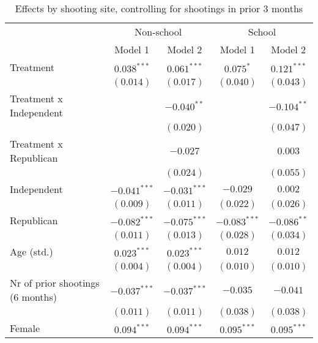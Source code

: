 
\begin{table}
\caption{Effects by shooting site, controlling for shootings in prior 3 months}
\begin{center}
\begin{tabular}{l c c c c}
\toprule
 & \multicolumn{2}{c}{Non-school} & \multicolumn{2}{c}{School} \\
\cmidrule(lr){2-3} \cmidrule(lr){4-5}
 & Model 1 & Model 2 & Model 1 & Model 2 \\
\midrule
Treatment                        & $0.038^{***}$  & $0.061^{***}$  & $0.075^{*}$    & $0.121^{***}$  \\
                                 & $(0.014)$      & $(0.017)$      & $(0.040)$      & $(0.043)$      \\
Treatment x Independent          &                & $-0.040^{**}$  &                & $-0.104^{**}$  \\
                                 &                & $(0.020)$      &                & $(0.047)$      \\
Treatment x Republican           &                & $-0.027$       &                & $0.003$        \\
                                 &                & $(0.024)$      &                & $(0.055)$      \\
Independent                      & $-0.041^{***}$ & $-0.031^{***}$ & $-0.029$       & $0.002$        \\
                                 & $(0.009)$      & $(0.011)$      & $(0.022)$      & $(0.026)$      \\
Republican                       & $-0.082^{***}$ & $-0.075^{***}$ & $-0.083^{***}$ & $-0.086^{**}$  \\
                                 & $(0.011)$      & $(0.013)$      & $(0.028)$      & $(0.034)$      \\
Age (std.)                       & $0.023^{***}$  & $0.023^{***}$  & $0.012$        & $0.012$        \\
                                 & $(0.004)$      & $(0.004)$      & $(0.010)$      & $(0.010)$      \\
Nr of prior shootings (6 months) & $-0.037^{***}$ & $-0.037^{***}$ & $-0.035$       & $-0.041$       \\
                                 & $(0.011)$      & $(0.011)$      & $(0.038)$      & $(0.038)$      \\
Female                           & $0.094^{***}$  & $0.094^{***}$  & $0.095^{***}$  & $0.095^{***}$  \\

\end{tabular}
\end{center}
\end{table}
